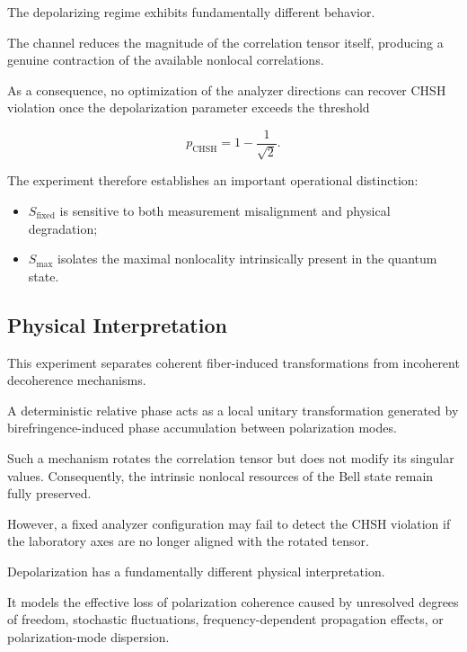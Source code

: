 \medskip

The depolarizing regime exhibits fundamentally different behavior.

The channel reduces the magnitude of the correlation tensor itself, producing a genuine contraction of the available nonlocal correlations.

As a consequence, no optimization of the analyzer directions can recover CHSH violation once the depolarization parameter exceeds the threshold

\[
p_{\mathrm{CHSH}}
=
1-\frac{1}{\sqrt{2}}.
\]

The experiment therefore establishes an important operational distinction:

\begin{itemize}
    \item \(S_{\mathrm{fixed}}\) is sensitive to both measurement misalignment and physical degradation;
    \item \(S_{\max}\) isolates the maximal nonlocality intrinsically present in the quantum state.
\end{itemize}


\subsection{Physical Interpretation}

This experiment separates coherent fiber-induced transformations from incoherent decoherence mechanisms.

A deterministic relative phase acts as a local unitary transformation generated by birefringence-induced phase accumulation between polarization modes.

Such a mechanism rotates the correlation tensor but does not modify its singular values. Consequently, the intrinsic nonlocal resources of the Bell state remain fully preserved.

However, a fixed analyzer configuration may fail to detect the CHSH violation if the laboratory axes are no longer aligned with the rotated tensor.

\medskip

Depolarization has a fundamentally different physical interpretation.

It models the effective loss of polarization coherence caused by unresolved degrees of freedom, stochastic fluctuations, frequency-dependent propagation effects, or polarization-mode dispersion.

